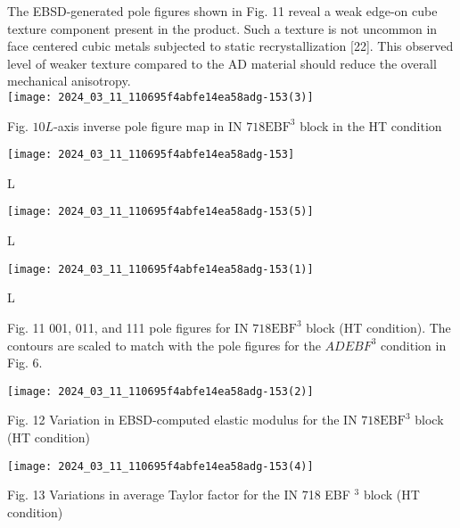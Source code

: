 \documentclass[10pt]{article}
\begin{document}
The EBSD-generated pole figures shown in Fig. 11 reveal a weak edge-on cube texture component present in the product. Such a texture is not uncommon in face centered cubic metals subjected to static recrystallization [22]. This observed level of weaker texture compared to the AD material should reduce the overall mechanical anisotropy.\\
\texttt{[image: 2024\_03\_11\_110695f4abfe14ea58adg-153(3)]}

Fig. $10 L$-axis inverse pole figure map in IN $718 \mathrm{EBF}^{3}$ block in the HT condition

\begin{center}
\texttt{[image: 2024\_03\_11\_110695f4abfe14ea58adg-153]}
\end{center}

L

\begin{center}
\texttt{[image: 2024\_03\_11\_110695f4abfe14ea58adg-153(5)]}
\end{center}

L

\begin{center}
\texttt{[image: 2024\_03\_11\_110695f4abfe14ea58adg-153(1)]}
\end{center}

L

Fig. 11 001, 011, and 111 pole figures for IN $718 \mathrm{EBF}^{3}$ block (HT condition). The contours are scaled to match with the pole figures for the $A D E B F^{3}$ condition in Fig. 6.

\begin{center}
\texttt{[image: 2024\_03\_11\_110695f4abfe14ea58adg-153(2)]}
\end{center}

Fig. 12 Variation in EBSD-computed elastic modulus for the IN $718 \mathrm{EBF}^{3}$ block (HT condition)

\begin{center}
\texttt{[image: 2024\_03\_11\_110695f4abfe14ea58adg-153(4)]}
\end{center}

Fig. 13 Variations in average Taylor factor for the IN 718 EBF $^{3}$ block (HT condition)
\end{document}
